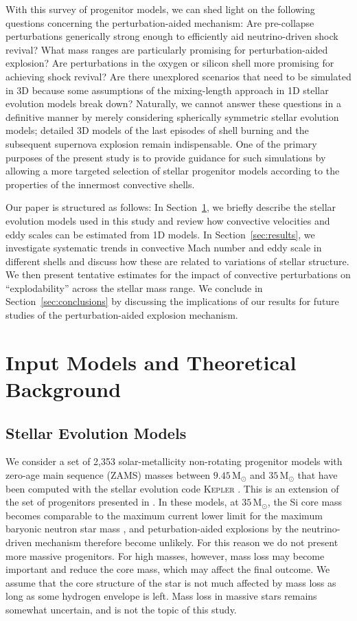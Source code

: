 \documentclass[useAMS,usenatbib]{mnras}
\newcommand{\Msun}{\ensuremath{\mathrm{M}_\odot}}
\begin{document}
With this survey of
progenitor models, we can shed light on the following questions
concerning the perturbation-aided mechanism: Are pre-collapse
perturbations generically strong enough to efficiently aid
neutrino-driven shock revival? What mass ranges are particularly
promising for perturbation-aided explosion?  Are perturbations in the
oxygen or silicon shell more promising for achieving shock revival? Are there unexplored scenarios that need to be simulated in 3D because some assumptions of the mixing-length approach in 1D stellar evolution models break down?
Naturally, we cannot answer these questions in a definitive manner by
merely considering spherically symmetric stellar evolution models;
detailed 3D models of the last episodes of shell burning and the
subsequent supernova explosion remain indispensable. One of the
primary purposes of the present study is to provide guidance for such
simulations by allowing a more targeted selection of stellar progenitor
models according to the properties of the innermost convective shells.

Our paper is structured as follows: In Section~\ref{sec:models}, we
briefly describe the stellar evolution models used in this study and
review how convective velocities and eddy scales can be estimated from
1D models. In Section~\ref{sec:results}, we investigate systematic
trends in convective Mach number and eddy scale in different shells
and discuss how these are related to variations of stellar structure.
We then present tentative estimates for the impact of convective
perturbations on ``explodability'' across the stellar mass range. We
conclude in Section~\ref{sec:conclusions} by discussing the
implications of our results for future studies of the
perturbation-aided explosion mechanism.

\section{Input Models and Theoretical Background}
\label{sec:models}

\subsection{Stellar Evolution Models}

We consider a set of 2,353 solar-metallicity non-rotating progenitor
models with zero-age main sequence (ZAMS) masses between $9.45
\,\Msun$ and $35\,\Msun$ that have been computed with the stellar
evolution code \textsc{Kepler} \citep{weaver_78,heger_10}.  This is an
extension of the set of progenitors presented in \citet{mueller_16a}.
In these models, at $35\,\Msun$, the Si core mass becomes comparable
to the maximum current lower limit for the maximum baryonic neutron
star mass \citep{demorest_10,antoniadis_16}, and peturbation-aided
explosions by the neutrino-driven mechanism therefore become unlikely.
For this reason we do not present more massive progenitors.  For high
masses, however, mass loss may become important and reduce the core
mass, which may affect the final outcome.  We assume that the core
structure of the star is not much affected by mass loss as long as
some hydrogen envelope is left.  Mass loss in massive stars remains somewhat
uncertain, and is not the topic of this study.
\end{document}
